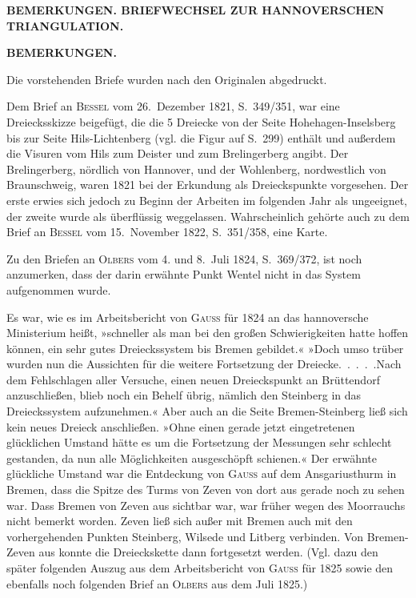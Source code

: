 \par\clearpage
\noindent\null\hfill{\footnotesize\textbf{BEMERKUNGEN. BRIEFWECHSEL ZUR HANNOVERSCHEN TRIANGULATION.}}\hfill{}\par\medskip
\begin{center}\textbf{BEMERKUNGEN.}\end{center}
\begingroup\small
\par\noindent\hspace*{\parindent}Die vorstehenden Briefe wurden nach den Originalen abgedruckt.
\par\noindent\hspace*{\parindent}Dem Brief an \textsc{Bessel} vom 26.~Dezember 1821, S.~349/351, war eine Dreiecksskizze beigefügt, die die 5 Dreiecke von der Seite Hohehagen-Inselsberg bis zur Seite Hils-Lichtenberg (vgl. die Figur auf S.~299) enthält und außerdem die Visuren vom Hils zum Deister und zum Brelingerberg angibt. Der Brelingerberg, nördlich von Hannover, und der Wohlenberg, nordwestlich von Braunschweig, waren 1821 bei der Erkundung als Dreieckspunkte vorgesehen. Der erste erwies sich jedoch zu Beginn der Arbeiten im folgenden Jahr als ungeeignet, der zweite wurde als überflüssig weggelassen. Wahrscheinlich gehörte auch zu dem Brief an \textsc{Bessel} vom 15.~November 1822, S.~351/358, eine Karte.
\par\noindent\hspace*{\parindent}Zu den Briefen an \textsc{Olbers} vom 4. und 8.~Juli 1824, S.~369/372, ist noch anzumerken, dass der darin erwähnte Punkt Wentel nicht in das System aufgenommen wurde.
\par\noindent\hspace*{\parindent}Es war, wie es im Arbeitsbericht von \textsc{Gauss} für 1824 an das hannoversche Ministerium heißt, »schneller als man bei den großen Schwierigkeiten hatte hoffen können, ein sehr gutes Dreieckssystem bis Bremen gebildet.« »Doch umso trüber wurden nun die Aussichten für die weitere Fortsetzung der Dreiecke.\ \mbox{.\ .\ .\ .}\quad Nach dem Fehlschlagen aller Versuche, einen neuen Dreieckspunkt an Brüttendorf anzuschließen, blieb noch ein Behelf übrig, nämlich den Steinberg in das Dreieckssystem aufzunehmen.« Aber auch an die Seite Bremen-Steinberg ließ sich kein neues Dreieck anschließen. »Ohne einen gerade jetzt eingetretenen glücklichen Umstand hätte es um die Fortsetzung der Messungen sehr schlecht gestanden, da nun alle Möglichkeiten ausgeschöpft schienen.« Der erwähnte glückliche Umstand war die Entdeckung von \textsc{Gauss} auf dem Ansgariusthurm in Bremen, dass die Spitze des Turms von Zeven von dort aus gerade noch zu sehen war. Dass Bremen von Zeven aus sichtbar war, war früher wegen des Moorrauchs nicht bemerkt worden. Zeven ließ sich außer mit Bremen auch mit den vorhergehenden Punkten Steinberg, Wilsede und Litberg verbinden. Von Bremen-Zeven aus konnte die Dreieckskette dann fortgesetzt werden. (Vgl. dazu den später folgenden Auszug aus dem Arbeitsbericht von \textsc{Gauss} für 1825 sowie den ebenfalls noch folgenden Brief an \textsc{Olbers} aus dem Juli 1825.)
